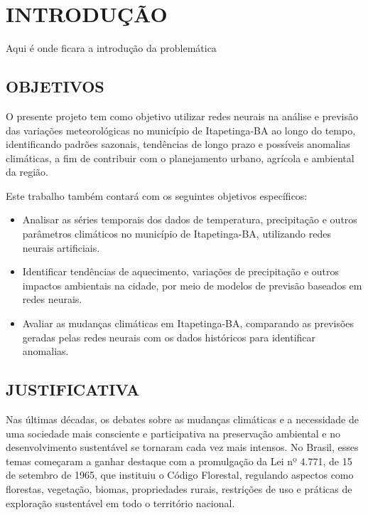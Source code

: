 \chapter{INTRODUÇÃO}

Aqui é onde ficara a introdução da problemática

\section{OBJETIVOS}
    O presente projeto tem como objetivo utilizar redes neurais na análise e previsão das variações meteorológicas no 
    município de Itapetinga-BA ao longo do tempo, identificando padrões sazonais, tendências de longo prazo e 
    possíveis anomalias climáticas, a fim de contribuir com o planejamento urbano, agrícola e ambiental da região.
    
    Este trabalho também contará com os seguintes objetivos específicos:

    \begin{itemize}
        \item Analisar as séries temporais dos dados de temperatura, precipitação e outros 
              parâmetros climáticos no município de Itapetinga-BA, utilizando redes neurais artificiais.
        \item Identificar tendências de aquecimento, variações de precipitação e outros 
              impactos ambientais na cidade, por meio de modelos de previsão baseados em redes neurais.
        \item Avaliar as mudanças climáticas em Itapetinga-BA, comparando as previsões 
              geradas pelas redes neurais com os dados históricos para identificar anomalias.
    \end{itemize}

\section{JUSTIFICATIVA}

    Nas últimas décadas, os debates sobre as mudanças climáticas e a necessidade de uma sociedade mais consciente e 
    participativa na preservação ambiental e no desenvolvimento sustentável se tornaram cada vez mais intensos. 
    No Brasil, esses temas começaram a ganhar destaque com a promulgação da Lei nº 4.771, de 15 de setembro de 1965, 
    que instituiu o Código Florestal, regulando aspectos como florestas, vegetação, biomas, propriedades rurais, 
    restrições de uso e práticas de exploração sustentável em todo o território nacional.
    

